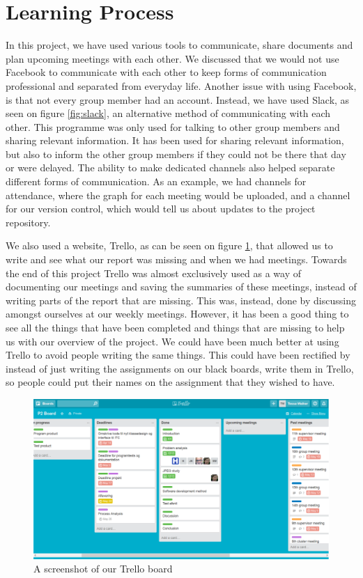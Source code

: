\begin{figure}
	\centering
	
\end{figure}

\section{Learning Process}
In this project, we have used various tools to communicate, share documents and plan upcoming meetings with each other. 
We discussed that we would not use Facebook to communicate with each other to keep forms of communication professional and separated from everyday life.
Another issue with using Facebook, is that not every group member had an account.
Instead, we have used Slack, as seen on figure \ref{fig:slack}, an alternative method of communicating with each other. 
This programme was only used for talking to other group members and sharing relevant information. 
It has been used for sharing relevant information, but also to inform the other group members if they could not be there that day or were delayed. 
The ability to make dedicated channels also helped separate different forms of communication. As an example, we had channels for attendance, where the graph for each meeting would be uploaded, and a channel for our version control, which would tell us about updates to the project repository.

We also used a website, Trello, as can be seen on figure \ref{fig:trello}, that allowed us to write and see what our report was missing and when we had meetings. 
Towards the end of this project Trello was almost exclusively used as a way of documenting our meetings and saving the summaries of these meetings, instead of writing parts of the report that are missing. 
This was, instead, done by discussing amongst ourselves at our weekly meetings.
However, it has been a good thing to see all the things that have been completed and things that are missing to help us with our overview of the project.
We could have been much better at using Trello to avoid people writing the same things.
This could have been rectified by instead of just writing the assignments on our black boards, write them in Trello, so people could put their names on the assignment that they wished to have.

\begin{figure}
	\centering
	\includegraphics[width=1 \textwidth]{figures/trello.png}
	\caption{A screenshot of our Trello board}
	\label{fig:trello}
\end{figure}

